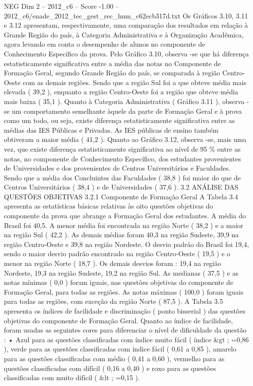 \begin{textsample}{NEG Dim 2 – 2012\_c6 – Score -1.00 – 2012\_c6/enade\_2012\_tec\_gest\_rec\_hum\_c62ecb317d.txt}
Os Gráficos 3.10, 3.11 e 3.12 apresentam, respectivamente, uma comparação dos resultados em relação à Grande Região do país, à Categoria Administrativa e à Organização Acadêmica, agora levando em conta o desempenho de alunos no componente de Conhecimento Específico da prova.
Pelo Gráfico 3.10, observa -se que há diferença estatisticamente significativa entre a média das notas no Componente de Formação Geral, segundo Grande Região do país, se comparada à região Centro-Oeste com as demais regiões.
Sendo que a região Sul foi a que obteve média mais elevada ( 39,2 ), enquanto a região Centro-Oeste foi a região que obteve média mais baixa ( 35,1 ).
Quanto à Categoria Administrativa ( Gráfico 3.11 ), observa -se um comportamento semelhante àquele da parte de Formação Geral e à prova como um todo, ou seja, existe diferença estatisticamente significativa entre as médias das IES Públicas e Privadas.
As IES públicas de ensino também obtiveram a maior média ( 41,2 ).
Quanto ao Gráfico 3.12, observa -se, mais uma vez, que existe diferença estatisticamente significativa ao nível de 95 \% entre as notas, no componente de Conhecimento Específico, dos estudantes provenientes de Universidades e dos provenientes de Centros Universitários e Faculdades.
Sendo que a média dos Concluintes das Faculdades ( 38,8 ) foi maior do que de Centros Universitários ( 38,4 ) e de Universidades ( 37,6 ). 3.2 ANÁLISE DAS QUESTÕES OBJETIVAS 3.2.1 Componente de Formação Geral A Tabela 3.4 apresenta as estatísticas básicas relativas às oito questões objetivas do componente da prova que abrange a Formação Geral dos estudantes.
A média do Brasil foi 40,5.
A menor média foi encontrada na região Norte ( 38,2 ) e a maior na região Sul ( 42,2 ).
As demais médias foram 40,3 na região Sudeste, 39,9 na região Centro-Oeste e 39,8 na região Nordeste.
O desvio padrão do Brasil foi 19,4, sendo o maior desvio padrão encontrado na região Centro-Oeste ( 19,5 ) e o menor na região Norte ( 18,7 ).
Os demais desvios foram : 19,4 na região Nordeste, 19,3 na região Sudeste, 19,2 na região Sul.
As medianas ( 37,5 ) e as notas mínimas ( 0,0 ) foram iguais, nas questões objetivas do componente de Formação Geral, para todas as regiões.
As notas máximas ( 100,0 ) foram iguais para todas as regiões, com exceção da região Norte ( 87,5 ).
A Tabela 3.5 apresenta os índices de facilidade e discriminação ( ponto bisserial ) das questões objetivas do componente de Formação Geral.
Quanto ao índice de facilidade, foram usadas as seguintes cores para diferenciar o nível de dificuldade da questão : • Azul para as questões classificadas com índice muito fácil ( índice \&gt ; =0,86 ), verde para as questões classificadas com índice fácil ( 0,61 a 0,85 ), amarelo para as questões classificadas com médio ( 0,41 a 0,60 ), vermelho para as questões classificadas com difícil ( 0,16 a 0,40 ) e roxo para as questões classificadas com muito difícil ( \&lt ; =0,15 ).

\end{textsample}
